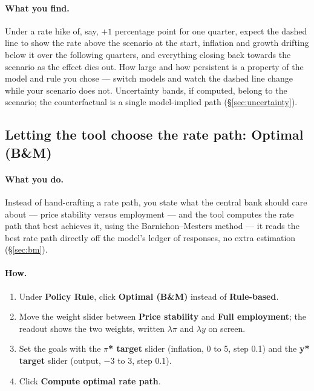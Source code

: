 \documentclass[11pt]{article}
\theoremstyle{definition}
\theoremstyle{remark}
\begin{document}
\paragraph{What you find.} Under a rate hike of, say, $+1$ percentage point
for one quarter, expect the dashed line to show the rate above the scenario
at the start, inflation and growth drifting below it over the following
quarters, and everything closing back towards the scenario as the effect dies
out. How large and how persistent is a property of the model and rule you
chose --- switch models and watch the dashed line change while your scenario
does not. Uncertainty bands, if computed, belong to the scenario; the
counterfactual is a single model-implied path (\S\ref{sec:uncertainty}).

\subsection{Letting the tool choose the rate path: Optimal (B\&M)}

\paragraph{What you do.} Instead of hand-crafting a rate path, you state what
the central bank should care about --- price stability versus employment ---
and the tool computes the rate path that best achieves it, using the
Barnichon--Mesters method --- it reads the best rate path directly off the
model's ledger of responses, no extra estimation (\S\ref{sec:bm}).

\paragraph{How.}
\begin{enumerate}
  \item Under \textbf{Policy Rule}, click \textbf{Optimal (B\&M)} instead of
    \textbf{Rule-based}.
  \item Move the weight slider between \textbf{Price stability} and
    \textbf{Full employment}; the readout shows the two weights, written
    $\lambda\pi$ and $\lambda y$ on screen.
  \item Set the goals with the \textbf{$\pi$* target} slider (inflation, 0 to
    5, step 0.1) and the \textbf{y* target} slider (output, $-3$ to $3$,
    step 0.1).
  \item Click \textbf{Compute optimal rate path}.
\end{enumerate}
\end{document}
